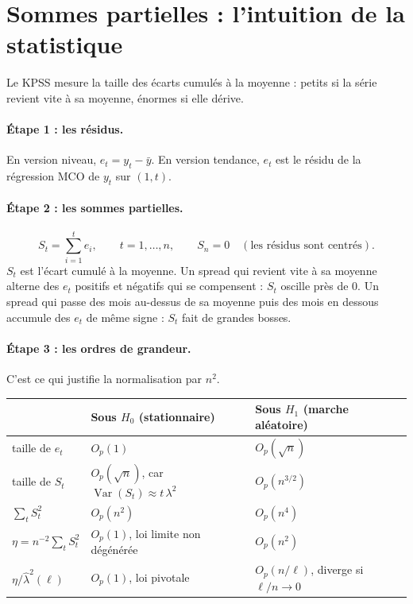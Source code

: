 \documentclass[11pt,a4paper]{article}
\newcommand{\Var}{\operatorname{Var}}
\theoremstyle{definition}
\begin{document}
\section{Sommes partielles : l'intuition de la statistique}

Le KPSS mesure la taille des écarts cumulés à la moyenne : petits si la série revient vite à sa moyenne, énormes si elle dérive.

\paragraph{Étape 1 : les résidus.} En version niveau, $e_t = y_t - \bar y$. En version tendance, $e_t$ est le résidu de la régression MCO de $y_t$ sur $(1, t)$.

\paragraph{Étape 2 : les sommes partielles.}
\[
S_t = \sum_{i=1}^{t} e_i, \qquad t = 1,\dots,n, \qquad S_n = 0 \quad (\text{les résidus sont centrés}).
\]
$S_t$ est l'écart cumulé à la moyenne. Un spread qui revient vite à sa moyenne alterne des $e_t$ positifs et négatifs qui se compensent : $S_t$ oscille près de $0$. Un spread qui passe des mois au-dessus de sa moyenne puis des mois en dessous accumule des $e_t$ de même signe : $S_t$ fait de grandes bosses.

\paragraph{Étape 3 : les ordres de grandeur.} C'est ce qui justifie la normalisation par $n^2$.

\begin{center}
\begin{tabular}{@{}lll@{}}
\toprule
 & Sous $H_0$ (stationnaire) & Sous $H_1$ (marche aléatoire) \\
\midrule
taille de $e_t$ & $O_p(1)$ & $O_p(\sqrt n)$ \\
taille de $S_t$ & $O_p(\sqrt n)$, car $\Var(S_t) \approx t\,\lambda^2$ & $O_p(n^{3/2})$ \\
$\sum_t S_t^2$ & $O_p(n^2)$ & $O_p(n^4)$ \\
$\eta = n^{-2}\sum_t S_t^2$ & $O_p(1)$, loi limite non dégénérée & $O_p(n^2)$ \\
$\eta / \hat\lambda^2(\ell)$ & $O_p(1)$, loi pivotale & $O_p(n/\ell)$, diverge si $\ell/n \to 0$ \\
\bottomrule
\end{tabular}
\end{center}
\end{document}
